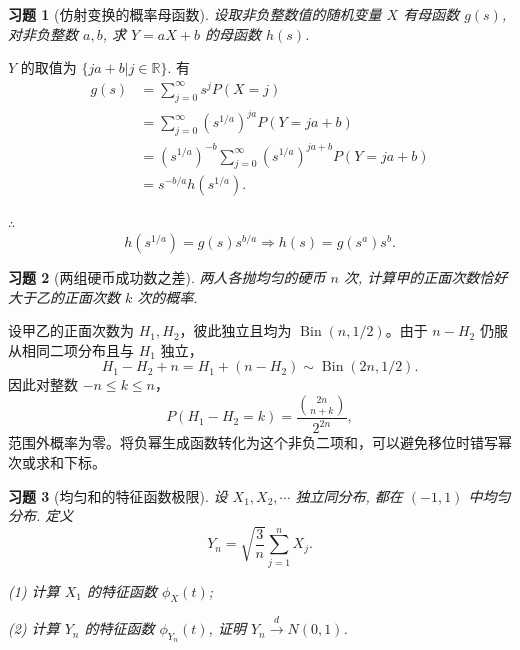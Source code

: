 \documentclass[12pt,fontset=fandol]{ctexart}
\newtheorem{exercise}{习题}[section]
\begin{document}
\begin{exercise}[仿射变换的概率母函数]\label{q:A6.21}
设取非负整数值的随机变量 $X$ 有母函数 $g(s)$, 对非负整数 $a,b$, 求 $Y=aX+b$ 的母函数 $h(s)$.\par{}
\end{exercise}

\begin{solve}\label{a:A6.21}
    $Y$ 的取值为 $\{ja+b|j\in\mathbb{R}\}$. 有
    \begin{align*}
        g(s) & =\sum\limits_{j=0}^\infty s^jP(X=j) \\
        & =\sum\limits_{j=0}^\infty(s^{1/a})^{ja}P(Y=ja+b) \\
        & =(s^{1/a})^{-b}\sum\limits_{j=0}^\infty(s^{1/a})^{ja+b}P(Y=ja+b) \\
        & =s^{-b/a}h(s^{1/a}).
    \end{align*}

    $\therefore$
    \[h(s^{1/a})=g(s)s^{b/a}\Rightarrow h(s)=g(s^a)s^b.\]
\end{solve}

\begin{exercise}[两组硬币成功数之差]\label{q:A6.24}
两人各抛均匀的硬币 $n$ 次, 计算甲的正面次数恰好大于乙的正面次数 $k$ 次的概率.\par{}
\end{exercise}

\begin{solve}\label{a:A6.24}设甲乙的正面次数为 $H_1,H_2$，彼此独立且均为 $\operatorname{Bin}(n,1/2)$。由于 $n-H_2$ 仍服从相同二项分布且与 $H_1$ 独立，\[H_1-H_2+n=H_1+(n-H_2)\sim\operatorname{Bin}(2n,1/2).\]因此对整数 $-n\le k\le n$，\[P(H_1-H_2=k)=\frac{\binom{2n}{n+k}}{2^{2n}},\]范围外概率为零。将负幂生成函数转化为这个非负二项和，可以避免移位时错写幂次或求和下标。\end{solve}

\begin{exercise}[均匀和的特征函数极限]\label{q:A6.29}
设 $X_1,X_2,\cdots$ 独立同分布, 都在 $(-1,1)$ 中均匀分布. 定义
    \[Y_n=\sqrt{\dfrac{3}{n}}\sum\limits_{j=1}^nX_j.\]

    (1) 计算 $X_1$ 的特征函数 $\phi_X(t)$;

    (2) 计算 $Y_n$ 的特征函数 $\phi_{Y_n}(t)$, 证明 $Y_n\xrightarrow{d}N(0,1)$.\par{}
\end{exercise}
\end{document}
